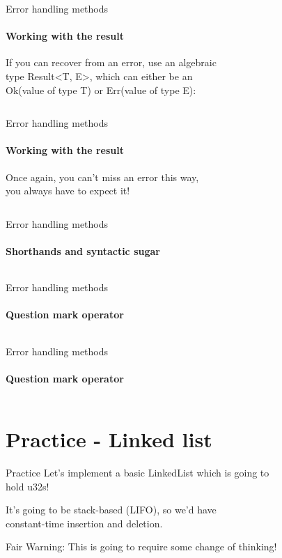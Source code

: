 \documentclass[usenames,dvipsnames,10pt,aspectratio=169]{beamer}
\begin{document}
\begin{frame}{Error handling methods}
\framesubtitle{Working with the result}

\normalsize
If you can recover from an error, use an algebraic\\
type \textcolor{ucuyellow}{Result<T, E>}, which can either be an\\
\textcolor{ucuyellow}{Ok(value of type T)} or 
\textcolor{ucuyellow}{Err(value of type E)}:
\vspace{0.2cm}
\inputminted[fontsize=\Large]{rust}{code/error2.rs}
\vspace{0.55cm}
\end{frame}

\begin{frame}{Error handling methods}
\framesubtitle{Working with the result}
\large
Once again, you can't miss an error this way,\\
you always have to expect it!
\vspace{0.2cm}
\inputminted[fontsize=\Large]{rust}{code/error3.rs}
\vspace{0.55cm}
\end{frame}

\begin{frame}{Error handling methods}
\framesubtitle{Shorthands and syntactic sugar}
\normalsize
\inputminted[fontsize=\Large]{rust}{code/error4.rs}
\end{frame}

\begin{frame}{Error handling methods}
\framesubtitle{Question mark operator}
\inputminted[fontsize=\large]{rust}{code/error5.rs}
\vspace{0.5cm}
\end{frame}

\begin{frame}{Error handling methods}
\framesubtitle{Question mark operator}
\inputminted[fontsize=\large]{rust}{code/error6.rs}
\end{frame}


\section{Practice - Linked list}

\begin{frame}{Practice}
\large
Let's implement a basic LinkedList which is going to\\
hold \textcolor{ucuyellow}{u32}s!
\vspace{0.2cm}

It's going to be stack-based (LIFO), so we'd have\\
constant-time insertion and deletion.
\vspace{0.2cm}

Fair Warning: This is going to require some change of thinking!
\end{frame}
\end{document}
